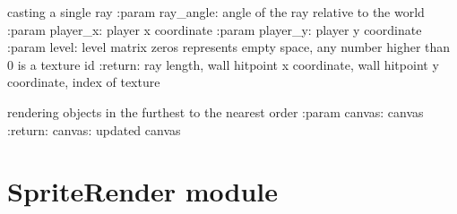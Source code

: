 \documentclass[letterpaper,10pt,english]{sphinxmanual}
\begin{document}
\begin{fulllineitems}
\begin{fulllineitems}
\end{fulllineitems}


\begin{fulllineitems}
\label{\detokenize{RaycastingEngine:RaycastingEngine.RaycastingEngine.check_ray_collision}}
\pysigstartsignatures
{}
\pysigstopsignatures
\sphinxAtStartPar
casting a single ray
:param ray\_angle: angle of the ray relative to the world
:param player\_x: player x coordinate
:param player\_y: player y coordinate
:param level: level matrix \sphinxhyphen{} zeros represents empty space, any number higher than 0 is a texture id
:return: ray length, wall hit\sphinxhyphen{}point x coordinate, wall hit\sphinxhyphen{}point y coordinate, index of texture

\end{fulllineitems}


\begin{fulllineitems}
\label{\detokenize{RaycastingEngine:RaycastingEngine.RaycastingEngine.render}}
\pysigstartsignatures
{}
\pysigstopsignatures
\sphinxAtStartPar
rendering objects in the furthest to the nearest order
:param canvas: canvas
:return: canvas: updated canvas

\end{fulllineitems}


\end{fulllineitems}


\sphinxstepscope


\section{SpriteRender module}
\label{\detokenize{SpriteRender:module-SpriteRender}}\label{\detokenize{SpriteRender:spriterender-module}}\label{\detokenize{SpriteRender::doc}}
\end{document}
